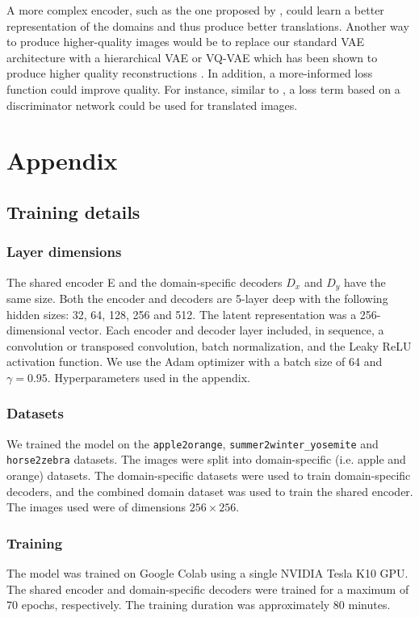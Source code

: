 \documentclass{article}
\begin{document}
A more complex encoder, such as the one proposed by \citet{liu}, could learn a better representation of the domains and thus produce better translations. Another way to produce higher-quality images would be to replace our standard VAE architecture with a hierarchical VAE or VQ-VAE which has been shown to produce higher quality reconstructions \citep{vahdat}. In addition, a more-informed loss function could improve quality. For instance, similar to \citet{liu}, a loss term based on a discriminator network could be used for translated images.

\newpage


\newpage
\appendix
\section*{Appendix}
\renewcommand{\thesubsection}{\Alph{subsection}}
\subsection{Training details}
\subsubsection{Layer dimensions}
The shared encoder E and the domain-specific decoders $D_x$ and $D_y$ have the same size. Both the encoder and decoders are 5-layer deep with the following hidden sizes: 32, 64, 128, 256 and 512. The latent representation was a 256-dimensional vector. Each encoder and decoder layer included, in sequence, a convolution or transposed convolution, batch normalization, and the Leaky ReLU activation function. We use the Adam optimizer with a batch size of 64 and $\gamma = 0.95$. Hyperparameters used in the appendix.

\subsubsection{Datasets}
We trained the model on the \texttt{apple2orange}, \texttt{summer2winter\_yosemite} and \texttt{horse2zebra} datasets. The images were split into domain-specific (i.e. apple and orange) datasets. The domain-specific datasets were used to train domain-specific decoders, and the combined domain dataset was used to train the shared encoder. The images used were of dimensions $256\times256$.
\subsubsection{Training}
The model was trained on Google Colab using a single NVIDIA Tesla K10 GPU. The shared encoder and domain-specific decoders were trained for a maximum of 70 epochs, respectively. The training duration was approximately 80 minutes.
\end{document}
